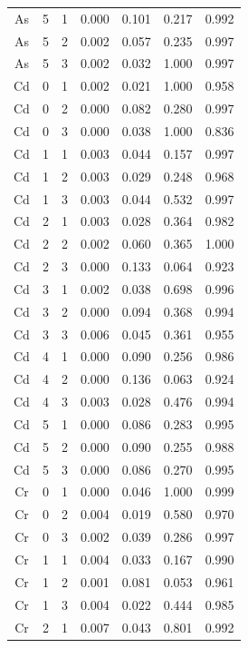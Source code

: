 \documentclass[ms, hidelinks]{uncgdissertationexp}
\theoremstyle{plain}
\theoremstyle{definition}
\theoremstyle{remark}
\begin{document}
\begin{longtable}{ccccccc}
As & 5 & 1 & 0.000 & 0.101 & 0.217 & 0.992\\
\rowcolor{gray!6}  As & 5 & 2 & 0.002 & 0.057 & 0.235 & 0.997\\
As & 5 & 3 & 0.002 & 0.032 & 1.000 & 0.997\\
\rowcolor{gray!6}  Cd & 0 & 1 & 0.002 & 0.021 & 1.000 & 0.958\\
Cd & 0 & 2 & 0.000 & 0.082 & 0.280 & 0.997\\
\rowcolor{gray!6}  Cd & 0 & 3 & 0.000 & 0.038 & 1.000 & 0.836\\
Cd & 1 & 1 & 0.003 & 0.044 & 0.157 & 0.997\\
\rowcolor{gray!6}  Cd & 1 & 2 & 0.003 & 0.029 & 0.248 & 0.968\\
Cd & 1 & 3 & 0.003 & 0.044 & 0.532 & 0.997\\
\rowcolor{gray!6}  Cd & 2 & 1 & 0.003 & 0.028 & 0.364 & 0.982\\
Cd & 2 & 2 & 0.002 & 0.060 & 0.365 & 1.000\\
\rowcolor{gray!6}  Cd & 2 & 3 & 0.000 & 0.133 & 0.064 & 0.923\\
Cd & 3 & 1 & 0.002 & 0.038 & 0.698 & 0.996\\
\rowcolor{gray!6}  Cd & 3 & 2 & 0.000 & 0.094 & 0.368 & 0.994\\
Cd & 3 & 3 & 0.006 & 0.045 & 0.361 & 0.955\\
\rowcolor{gray!6}  Cd & 4 & 1 & 0.000 & 0.090 & 0.256 & 0.986\\
Cd & 4 & 2 & 0.000 & 0.136 & 0.063 & 0.924\\
\rowcolor{gray!6}  Cd & 4 & 3 & 0.003 & 0.028 & 0.476 & 0.994\\
Cd & 5 & 1 & 0.000 & 0.086 & 0.283 & 0.995\\
\rowcolor{gray!6}  Cd & 5 & 2 & 0.000 & 0.090 & 0.255 & 0.988\\
Cd & 5 & 3 & 0.000 & 0.086 & 0.270 & 0.995\\
\rowcolor{gray!6}  Cr & 0 & 1 & 0.000 & 0.046 & 1.000 & 0.999\\
Cr & 0 & 2 & 0.004 & 0.019 & 0.580 & 0.970\\
\rowcolor{gray!6}  Cr & 0 & 3 & 0.002 & 0.039 & 0.286 & 0.997\\
Cr & 1 & 1 & 0.004 & 0.033 & 0.167 & 0.990\\
\rowcolor{gray!6}  Cr & 1 & 2 & 0.001 & 0.081 & 0.053 & 0.961\\
Cr & 1 & 3 & 0.004 & 0.022 & 0.444 & 0.985\\
\rowcolor{gray!6}  Cr & 2 & 1 & 0.007 & 0.043 & 0.801 & 0.992\\

\end{longtable}
\end{document}
